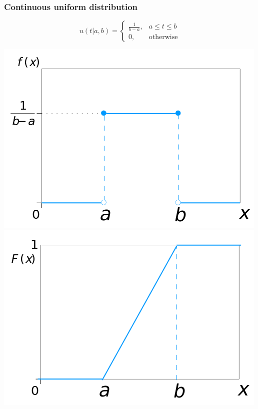 \documentclass{article}
\begin{document}
{{        \subsubsection{Continuous uniform distribution}{
            \[ u(t| a, b)= \begin{cases} 
                \frac{1}{b-a}, & a \leqslant t \leqslant b \\ 
                0, & \text{otherwise}
            \end{cases}\]
            \begin{center}{
                \includegraphics[scale=0.25]{Con_Uniform_distribution_pdf.png}\includegraphics[scale=0.25]{Con_Uniform_distribution_CDF.png}
            }
            \end{center}
        }
}}
\end{document}
